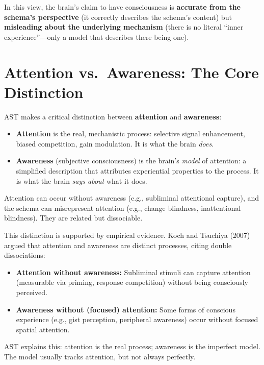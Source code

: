 \documentclass[11pt,a4paper]{report}
\begin{document}
In this view, the brain's claim to have consciousness is \textbf{accurate from the schema's perspective} (it correctly describes the schema's content) but \textbf{misleading about the underlying mechanism} (there is no literal ``inner experience''---only a model that describes there being one).

\section{Attention vs.\ Awareness: The Core Distinction}

AST makes a critical distinction between \textbf{attention} and \textbf{awareness}:

\begin{principlebox}
\begin{itemize}[leftmargin=1.5em]
  \item \textbf{Attention} is the real, mechanistic process: selective signal enhancement, biased competition, gain modulation. It is what the brain \emph{does}.
  \item \textbf{Awareness} (subjective consciousness) is the brain's \emph{model} of attention: a simplified description that attributes experiential properties to the process. It is what the brain \emph{says about} what it does.
\end{itemize}
Attention can occur without awareness (e.g., subliminal attentional capture), and the schema can misrepresent attention (e.g., change blindness, inattentional blindness). They are related but dissociable.
\end{principlebox}

This distinction is supported by empirical evidence. Koch and Tsuchiya (2007) argued that attention and awareness are distinct processes, citing double dissociations:
\begin{itemize}[leftmargin=1.5em]
  \item \textbf{Attention without awareness:} Subliminal stimuli can capture attention (measurable via priming, response competition) without being consciously perceived.
  \item \textbf{Awareness without (focused) attention:} Some forms of conscious experience (e.g., gist perception, peripheral awareness) occur without focused spatial attention.
\end{itemize}

AST explains this: attention is the real process; awareness is the imperfect model. The model usually tracks attention, but not always perfectly.
\end{document}
